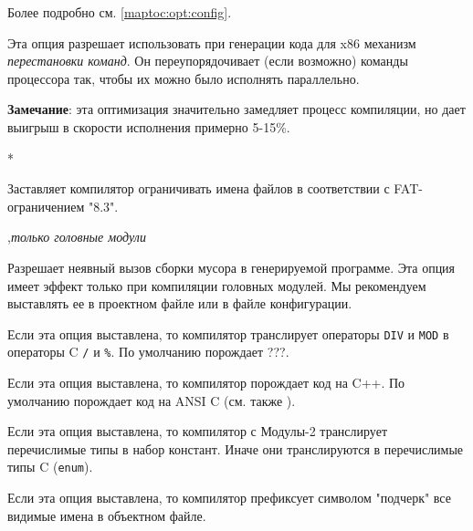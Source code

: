 \begin{description}
Более подробно см. \ref{maptoc:opt:config}.
\fi

\ifgencode
{}
        \MLBegin{}\ModeC{}\MLEnd{} \header

Эта опция разрешает использовать при генерации кода для x86
механизм {\em перестановки команд}. Он переупорядочивает 
(если возможно) команды
процессора так, чтобы их можно было исполнять параллельно.

        
{\bf Замечание}: эта оптимизация значительно замедляет процесс
компиляции, но дает выигрыш в скорости исполнения примерно 5-15\%.
\fi

        \MLBegin{}*\MLEnd{}

Заставляет компилятор ограничивать  имена файлов в соответствии с 
FAT-ограничением "8.3".

        \MLBegin{}\ModeC{},{\em только головные модули}\MLEnd{} \header

Разрешает неявный вызов сборки мусора в генерируемой программе.
Эта опция имеет эффект только при компиляции головных модулей.
Мы рекомендуем выставлять ее в проектном файле или в файле
конфигурации.

\ifgenc
{}
        \MLBegin{}\ModeC{}\MLEnd{} \header

Если эта опция выставлена, то компилятор транслирует операторы
\verb'DIV' и \verb'MOD' в операторы C \verb'/' и \verb'%'.
По умолчанию \xds{} порождает ???. %

        \MLBegin{}\ModeC{}\MLEnd{} \header

Если эта опция выставлена, то компилятор порождает код на C++.
По умолчанию \xds{} порождает код на ANSI C (см. также ).

        \MLBegin{}\ModeC{}\MLEnd{} \header

Если эта опция выставлена, то компилятор с Модулы-2 транслирует 
перечислимые типы в набор констант. Иначе они транслируются в
перечислимые типы C (\verb'enum').
\fi

\ifgencode
{}
        \MLBegin{}\ModeC{}\MLEnd{} \header

Если эта опция выставлена, то компилятор префиксует символом "подчерк"
все видимые имена в объектном файле.
\fi

\ifgenc
{}
        \MLBegin{}\ModeC{}\MLEnd{} \header


\end{description}
